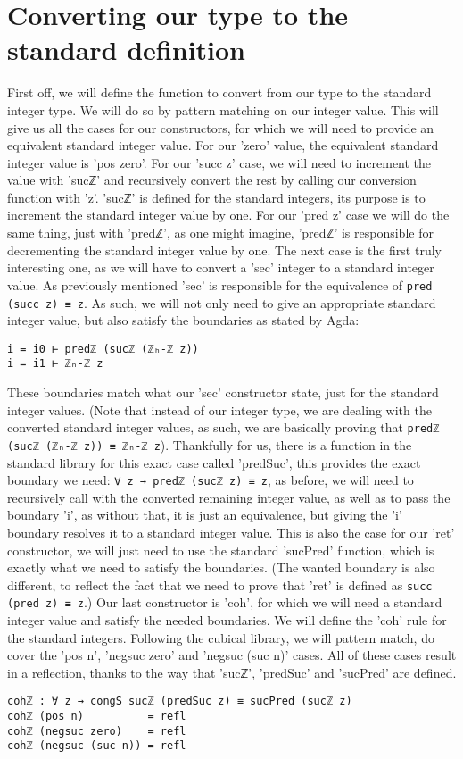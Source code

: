 \section{Converting our type to the standard definition}
First off, we will define the function to convert from our type to the standard integer type. We will do so by pattern matching on our integer value. This will give us all the cases for our constructors, for which we will need to provide an equivalent standard integer value. For our 'zero' value, the equivalent standard integer value is 'pos zero'. For our 'succ z' case, we will need to increment the value with 'sucℤ' and recursively convert the rest by calling our conversion function with 'z'. 'sucℤ' is defined for the standard integers, its purpose is to increment the standard integer value by one. For our 'pred z' case we will do the same thing, just with 'predℤ', as one might imagine, 'predℤ' is responsible for decrementing the standard integer value by one. The next case is the first truly interesting one, as we will have to convert a 'sec' integer to a standard integer value. As previously mentioned 'sec' is responsible for the equivalence of \texttt{pred (succ z) ≡ z}. As such, we will not only need to give an appropriate standard integer value, but also satisfy the boundaries as stated by Agda:
\begin{verbatim}
i = i0 ⊢ predℤ (sucℤ (ℤₕ-ℤ z))
i = i1 ⊢ ℤₕ-ℤ z
\end{verbatim}
These boundaries match what our 'sec' constructor state, just for the standard integer values. (Note that instead of our integer type, we are dealing with the converted standard integer values, as such, we are basically proving that \texttt{predℤ (sucℤ (ℤₕ-ℤ z)) ≡ ℤₕ-ℤ z}). Thankfully for us, there is a function in the standard library for this exact case called 'predSuc', this provides the exact boundary we need: \texttt{∀ z → predℤ (sucℤ z) ≡ z}, as before, we will need to recursively call with the converted remaining integer value, as well as to pass the boundary 'i', as without that, it is just an equivalence, but giving the 'i' boundary resolves it to a standard integer value.
This is also the case for our 'ret' constructor, we will just need to use the standard 'sucPred' function, which is exactly what we need to satisfy the boundaries. (The wanted boundary is also different, to reflect the fact that we need to prove that 'ret' is defined as \texttt{succ (pred z) ≡ z}.)
Our last constructor is 'coh', for which we will need a standard integer value and satisfy the needed boundaries. We will define the 'coh' rule for the standard integers. Following the cubical library, we will pattern match, do cover the 'pos n', 'negsuc zero' and 'negsuc (suc n)' cases. All of these cases result in a reflection, thanks to the way that 'sucℤ', 'predSuc' and 'sucPred' are defined.
\begin{verbatim}
cohℤ : ∀ z → congS sucℤ (predSuc z) ≡ sucPred (sucℤ z)
cohℤ (pos n)          = refl
cohℤ (negsuc zero)    = refl
cohℤ (negsuc (suc n)) = refl
\end{verbatim}


